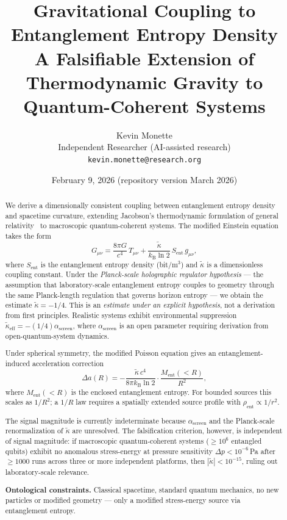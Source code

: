 \documentclass[12pt,letterpaper]{article}
\title{\textbf{Gravitational Coupling to Entanglement Entropy Density}\\[4pt]
\large A Falsifiable Extension of Thermodynamic Gravity to Quantum-Coherent Systems}
\author{Kevin Monette\\[2pt]
\small Independent Researcher (AI-assisted research)\\
\small \texttt{kevin.monette@research.org}}
\date{February 9, 2026 \quad (repository version March 2026)}
\theoremstyle{plain}
\theoremstyle{definition}
\theoremstyle{remark}
\newcommand{\kB}{k_{\mathrm{B}}}
\newcommand{\lnTwo}{\ln 2}
\newcommand{\kt}{\tilde{\kappa}}
\newcommand{\kteff}{\tilde{\kappa}_{\mathrm{eff}}}
\newcommand{\Sent}{S_{\mathrm{ent}}}
\newcommand{\Ment}{M_{\mathrm{ent}}}
\newcommand{\asc}{\alpha_{\mathrm{screen}}}
\newcommand{\Deltaa}{\Delta a}
\begin{document}
\maketitle

\begin{abstract}
We derive a dimensionally consistent coupling between entanglement entropy density and
spacetime curvature, extending Jacobson's thermodynamic formulation of general
relativity~\cite{Jacobson1995} to macroscopic quantum-coherent systems.  The modified Einstein
equation takes the form
\begin{equation*}
G_{\mu\nu}
= \frac{8\pi G}{c^{4}}\,T_{\mu\nu}
+ \frac{\kt}{k_{\mathrm{B}}\lnTwo}\,\Sent\,g_{\mu\nu},
\end{equation*}
where $\Sent$ is the entanglement entropy density (bit/m$^{3}$) and $\kt$ is a dimensionless
coupling constant.  Under the \emph{Planck-scale holographic regulator hypothesis} --- the
assumption that laboratory-scale entanglement entropy couples to geometry through the same
Planck-length regulation that governs horizon entropy --- we obtain the estimate $\kt = -1/4$.
This is an \emph{estimate under an explicit hypothesis}, not a derivation from first principles.
Realistic systems exhibit environmental suppression $\kteff = -(1/4)\asc$, where $\asc$ is an
open parameter requiring derivation from open-quantum-system dynamics.

Under spherical symmetry, the modified Poisson equation gives an entanglement-induced
acceleration correction
\begin{equation*}
  \Deltaa(R) = -\frac{\kt\,c^{4}}{8\pi\kB\lnTwo}\cdot
               \frac{\Ment(<R)}{R^{2}},
\end{equation*}
where $\Ment(<R)$ is the enclosed entanglement entropy.  For bounded sources this
scales as $1/R^{2}$; a $1/R$ law requires a spatially extended source profile with
$\rho_{\mathrm{ent}}\propto 1/r^{2}$.

The signal magnitude is currently indeterminate because $\asc$ and the Planck-scale
renormalization of $\kt$ are unresolved.  The falsification criterion, however, is
independent of signal magnitude: if macroscopic quantum-coherent systems ($\geq 10^{6}$
entangled qubits) exhibit no anomalous stress-energy at pressure sensitivity
$\Delta p < 10^{-6}$\,Pa after $\geq 1000$ runs across three or more independent platforms,
then $|\kt| < 10^{-15}$, ruling out laboratory-scale relevance.

\medskip\noindent
\textbf{Ontological constraints.} Classical spacetime, standard quantum mechanics, no new
particles or modified geometry --- only a modified stress-energy source via entanglement
entropy.
\end{abstract}
\end{document}
